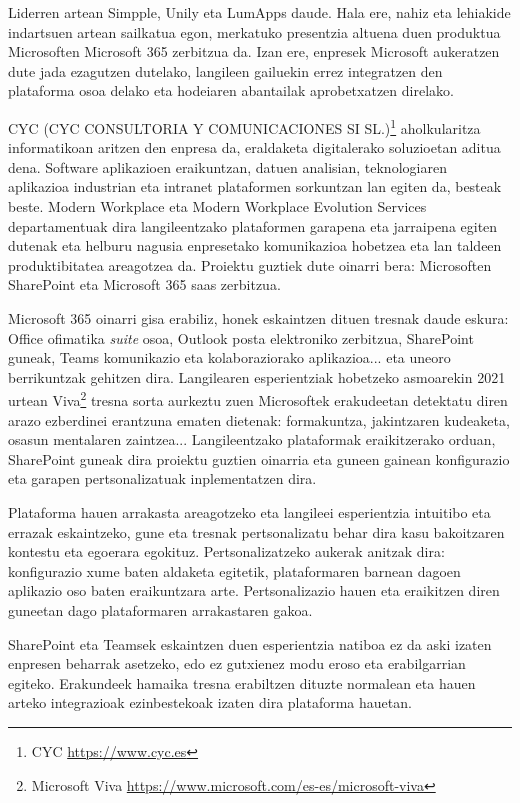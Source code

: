Liderren artean Simpple, Unily eta LumApps daude. Hala ere, nahiz eta lehiakide indartsuen artean sailkatua egon, merkatuko presentzia altuena duen produktua Microsoften Microsoft 365 zerbitzua da. Izan ere, enpresek Microsoft aukeratzen dute \cite{why-companies-microsoft-365} jada ezagutzen dutelako, langileen gailuekin errez integratzen den plataforma osoa delako eta hodeiaren abantailak aprobetxatzen direlako. 


CYC (CYC CONSULTORIA Y COMUNICACIONES SI SL.)\footnote{CYC \url{https://www.cyc.es}} aholkularitza informatikoan aritzen den enpresa da, eraldaketa digitalerako soluzioetan aditua dena. Software aplikazioen eraikuntzan, datuen analisian, teknologiaren aplikazioa industrian eta intranet plataformen sorkuntzan lan egiten da, besteak beste. Modern Workplace eta Modern Workplace Evolution Services departamentuak dira langileentzako plataformen garapena eta jarraipena egiten dutenak eta helburu nagusia enpresetako komunikazioa hobetzea eta lan taldeen produktibitatea areagotzea da. Proiektu guztiek dute oinarri bera: Microsoften SharePoint eta Microsoft 365 \acrshort{saas} zerbitzua.

Microsoft 365 oinarri gisa erabiliz, honek eskaintzen dituen tresnak daude eskura: Office ofimatika \textit{suite} osoa, Outlook posta elektroniko zerbitzua, SharePoint guneak, Teams komunikazio eta kolaboraziorako aplikazioa... eta uneoro berrikuntzak gehitzen dira. Langilearen esperientziak hobetzeko asmoarekin 2021 urtean Viva\footnote{Microsoft Viva \url{https://www.microsoft.com/es-es/microsoft-viva}} tresna sorta aurkeztu zuen Microsoftek erakudeetan detektatu diren arazo ezberdinei erantzuna ematen dietenak: formakuntza, jakintzaren kudeaketa, osasun mentalaren zaintzea... Langileentzako plataformak eraikitzerako orduan, SharePoint guneak dira proiektu guztien oinarria eta guneen gainean konfigurazio eta garapen pertsonalizatuak inplementatzen dira. 

Plataforma hauen arrakasta areagotzeko eta langileei esperientzia intuitibo eta errazak eskaintzeko, gune eta tresnak pertsonalizatu behar dira kasu bakoitzaren kontestu eta egoerara egokituz. Pertsonalizatzeko aukerak anitzak dira: konfigurazio xume baten aldaketa egitetik, plataformaren barnean dagoen aplikazio oso baten eraikuntzara arte. Pertsonalizazio hauen eta eraikitzen diren guneetan dago plataformaren arrakastaren gakoa.  

SharePoint eta Teamsek eskaintzen duen esperientzia natiboa ez da aski izaten enpresen beharrak asetzeko, edo ez gutxienez modu eroso eta erabilgarrian egiteko. Erakundeek hamaika tresna erabiltzen dituzte normalean eta hauen arteko integrazioak ezinbestekoak izaten dira plataforma hauetan. 

